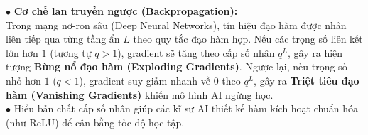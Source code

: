 \documentclass[12pt, a4paper]{article}
\begin{document}
\begin{aibox}
    $\bullet$ \textbf{Cơ chế lan truyền ngược (Backpropagation):}\\
    Trong mạng nơ-ron sâu (Deep Neural Networks), tín hiệu đạo hàm được nhân liên tiếp qua từng tầng ẩn $L$ theo quy tắc đạo hàm hợp. Nếu các trọng số liên kết lớn hơn $1$ (tương tự $q > 1$), gradient sẽ tăng theo cấp số nhân $q^L$, gây ra hiện tượng \textbf{Bùng nổ đạo hàm (Exploding Gradients)}. Ngược lại, nếu trọng số nhỏ hơn $1$ ($q < 1$), gradient suy giảm nhanh về $0$ theo $q^L$, gây ra \textbf{Triệt tiêu đạo hàm (Vanishing Gradients)} khiến mô hình AI ngừng học.\\
    $\bullet$ Hiểu bản chất cấp số nhân giúp các kĩ sư AI thiết kế hàm kích hoạt chuẩn hóa (như ReLU) để cân bằng tốc độ học tập.
\end{aibox}
\end{document}
